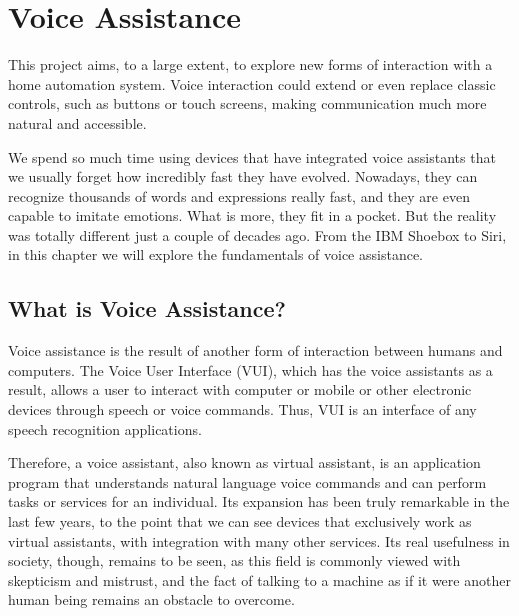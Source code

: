 \chapter{Voice Assistance}

This project aims, to a large extent, to explore new forms of interaction with a home automation system. Voice interaction could 
extend or even replace classic controls, such as buttons or touch screens, making communication much more natural and accessible.

We spend so much time using devices that have integrated voice assistants that we usually forget how incredibly fast they have
evolved. Nowadays, they can recognize thousands of words and expressions really fast, and they are even capable to imitate
emotions. What is more, they fit in a pocket. But the reality was totally different just a couple of decades ago. From the IBM
Shoebox to Siri, in this chapter we will explore the fundamentals of voice assistance.

\section{What is Voice Assistance?}
Voice assistance is the result of another form of interaction between humans and computers.\cite{botsocietyVUI} The Voice User
Interface (VUI), which has the voice assistants as a result, allows a user to interact with computer or mobile or other electronic
devices through speech or voice commands. Thus, VUI is an interface of any speech recognition applications.

Therefore, a voice assistant, also known as virtual assistant, is an application program that understands natural language voice
commands and can perform tasks or services for an individual. Its expansion has been truly remarkable in the last few years, to the
point that we can see devices that exclusively work as virtual assistants, with integration with many other services. Its real usefulness
in society, though, remains to be seen, as this field is commonly viewed with skepticism and mistrust, and the fact of talking to a
machine as if it were another human being remains an obstacle to overcome.

